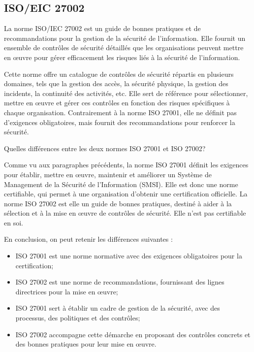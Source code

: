 \subsection{ISO/EIC 27002}


La norme ISO/IEC 27002 est un guide de bonnes pratiques et de recommandations pour la gestion de la sécurité de l'information. Elle fournit un ensemble de contrôles de sécurité détaillés que les organisations peuvent mettre en œuvre pour gérer efficacement les risques liés à la sécurité de l'information.

Cette norme offre un catalogue de contrôles de sécurité répartis en plusieurs domaines, tels que la gestion des accès, la sécurité physique, la gestion des incidents, la continuité des activités, etc. Elle sert de référence pour sélectionner, mettre en œuvre et gérer ces contrôles en fonction des risques spécifiques à chaque organisation. Contrairement à la norme ISO 27001, elle ne définit pas d'exigences obligatoires, mais fournit des recommandations pour renforcer la sécurité.

Quelles différences entre les deux normes ISO 27001 et ISO 27002?

Comme vu aux paragraphes précédents, la norme ISO 27001 définit les exigences pour établir, mettre en œuvre, maintenir et améliorer un Système de Management de la Sécurité de l'Information (SMSI). Elle est donc une norme certifiable, qui permet à une organisation d'obtenir une certification officielle.
La norme ISO 27002 est elle un guide de bonnes pratiques, destiné à aider à la sélection et à la mise en œuvre de contrôles de sécurité. Elle n’est pas certifiable en soi.

En conclusion, on peut retenir les différences suivantes : 

\begin{itemize}
   \item ISO 27001 est une norme normative avec des exigences obligatoires pour la certification;
   \item ISO 27002 est une norme de recommandations, fournissant des lignes directrices pour la mise en œuvre;
   \item ISO 27001 sert à établir un cadre de gestion de la sécurité, avec des processus, des politiques et des contrôles;
   \item ISO 27002 accompagne cette démarche en proposant des contrôles concrets et des bonnes pratiques pour leur mise en œuvre.
\end{itemize}

